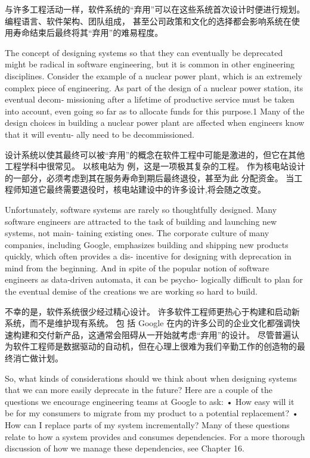 \documentclass[10pt,a4paper,UTF8]{ctexart}
\begin{document}
与许多工程活动一样，软件系统的“弃用”可以在这些系统首次设计时便进行规划。 编程语言、软件架构、团队组成，
甚至公司政策和文化的选择都会影响系统在使用寿命结束后最终将其“弃用”的难易程度。

The concept of designing systems so that they can eventually be deprecated might be radical in
software engineering, but it is common in other engineering disciplines. Consider the example of a
nuclear power plant, which is an extremely complex piece of engineering. As part of the design of a
nuclear power station, its eventual decom‐ missioning after a lifetime of productive service must be
taken into account, even going so far as to allocate funds for this purpose.1 Many of the design
choices in building a nuclear power plant are affected when engineers know that it will eventu‐ ally
need to be decommissioned.

设计系统以使其最终可以被“弃用”的概念在软件工程中可能是激进的，但它在其他工程学科中很常见。 以核电站为
例，这是一项极其复杂的工程。 作为核电站设计的一部分，必须考虑到其在服务寿命到期后最终退役，甚至为此
分配资金。  当工程师知道它最终需要退役时，核电站建设中的许多设计,将会随之改变。

Unfortunately, software systems are rarely so thoughtfully designed. Many software engineers are
attracted to the task of building and launching new systems, not main‐ taining existing ones. The
corporate culture of many companies, including Google, emphasizes building and shipping new products
quickly, which often provides a dis‐ incentive for designing with deprecation in mind from the
beginning. And in spite of the popular notion of software engineers as data-driven automata, it can
be psycho‐ logically difficult to plan for the eventual demise of the creations we are working so
hard to build.

不幸的是，软件系统很少经过精心设计。 许多软件工程师更热心于构建和启动新系统，而不是维护现有系统。 包
括 Google 在内的许多公司的企业文化都强调快速构建和交付新产品，这通常会阻碍从一开始就考虑“弃用”的设计。
尽管普遍认为软件工程师是数据驱动的自动机，但在心理上很难为我们辛勤工作的创造物的最终消亡做计划。

So, what kinds of considerations should we think about when designing systems that we can more easily deprecate in the future? Here are a couple of the questions we encourage engineering teams at Google to ask:
• How easy will it be for my consumers to migrate from my product to a potential replacement?
• How can I replace parts of my system incrementally?
Many of these questions relate to how a system provides and consumes dependencies. For a more thorough discussion of how we manage these dependencies, see Chapter 16.
\end{document}
